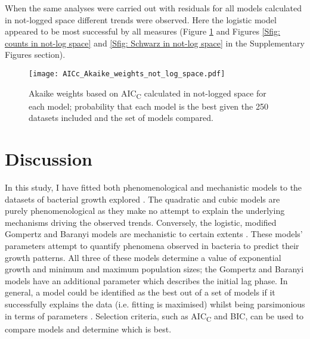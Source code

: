 \documentclass[11pt]{article}
\begin{document}
\begin{linenumbers}
        When the same analyses were carried out with residuals for all models calculated in not-logged space different trends were observed. Here the logistic model appeared to be most successful by all measures (Figure \ref{fig: Akaike in not-log space} and Figures \ref{Sfig: counts in not-log space} and \ref{Sfig: Schwarz in not-log space} in the Supplementary Figures section).
        
        \begin{figure}[ht!]
            \centering
            \texttt{[image: AICc\_Akaike\_weights\_not\_log\_space.pdf]}
            \caption{Akaike weights based on AIC\textsubscript{C} calculated in not-logged space for each model; probability that each model is the best given the 250 datasets included and the set of models compared.}
            \label{fig: Akaike in not-log space}
        \end{figure}


    \section{Discussion}
    
        In this study, I have fitted both phenomenological and mechanistic models to the datasets of bacterial growth explored . The quadratic and cubic models are purely phenomenological as they make no attempt to explain the underlying mechanisms driving the observed trends. Conversely, the logistic, modified Gompertz and Baranyi models are mechanistic to certain extents \citep{ferrer_mathematical_2009}. These models' parameters attempt to quantify phenomena observed in bacteria to predict their growth patterns. All three of these models determine a value of exponential growth and minimum and maximum population sizes; the Gompertz and Baranyi models have an additional parameter which describes the initial lag phase. In general, a model could be identified as the best out of a set of models if it successfully explains the data (i.e. fitting is maximised) whilst being parsimonious in terms of parameters \citep{johnson_model_2004}. Selection criteria, such as AIC\textsubscript{C} and BIC, can be used to compare models and determine which is best.
        

\end{linenumbers}
\end{document}
